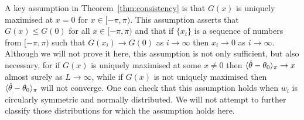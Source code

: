 \documentclass[journal]{IEEEtran}
\begin{document}

A key assumption in Theorem~\ref{thm:consistency} is that $G(x)$ is uniquely maximised at $x = 0$ for $x \in [-\pi, \pi)$.  This assumption asserts that $G(x) \leq G(0)$ for all $x \in [-\pi, \pi)$ and that if $\{x_i\}$ is a sequence of numbers from $[-\pi,\pi)$ such that $G(x_i) \rightarrow G(0)$ as $i \rightarrow \infty$ then $x_i \rightarrow 0$ as $i \rightarrow \infty$.  Although we will not prove it here, this assumption is not only sufficient, but also necessary, for if $G(x)$ is uniquely maximised at some $x \neq 0$ then $\langle \hat{\theta} - \theta_0 \rangle_\pi \rightarrow x$ almost surely as $L\rightarrow\infty$, while if $G(x)$ is not uniquely maximised then $\langle \hat{\theta} - \theta_0 \rangle_\pi$ will not converge.  One can check that this assumption holds when $w_i$ is circularly symmetric and normally distributed.  We will not attempt to further classify those distributions for which the assumption holds here.


\end{document}
